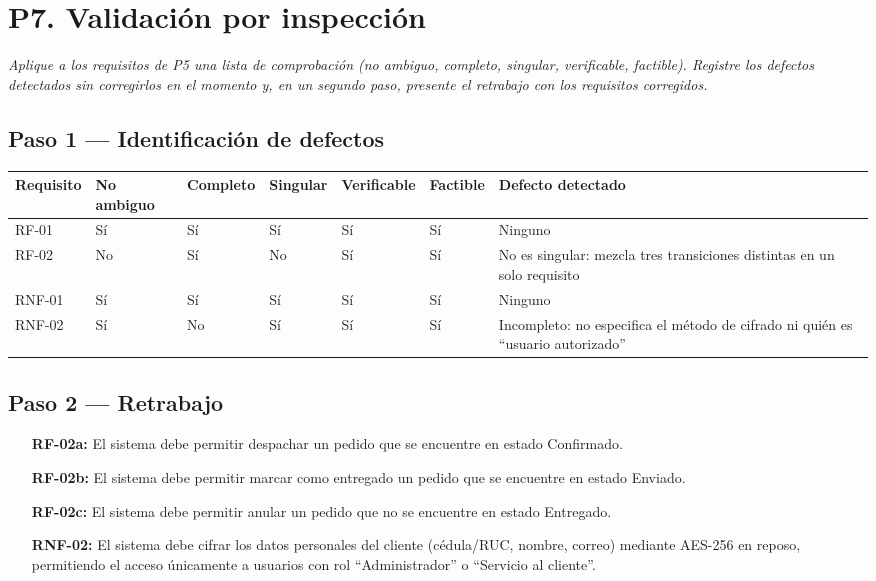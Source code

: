 \documentclass[11pt]{article}
\begin{document}
\section*{P7. Validación por inspección}

\textit{Aplique a los requisitos de P5 una lista de comprobación (no ambiguo, completo, singular, verificable, factible). Registre los defectos detectados sin corregirlos en el momento y, en un segundo paso, presente el retrabajo con los requisitos corregidos.}

\subsection*{Paso 1 --- Identificación de defectos}

\begin{center}
\small
\begin{tabular}{|p{1.4cm}|p{1.3cm}|p{1.3cm}|p{1.3cm}|p{1.5cm}|p{1.2cm}|p{4.5cm}|}
\hline
\textbf{Requisito} & \textbf{No ambiguo} & \textbf{Completo} & \textbf{Singular} & \textbf{Verificable} & \textbf{Factible} & \textbf{Defecto detectado} \\
\hline
RF-01 & Sí & Sí & Sí & Sí & Sí & Ninguno \\
\hline
RF-02 & No & Sí & No & Sí & Sí & No es singular: mezcla tres transiciones distintas en un solo requisito \\
\hline
RNF-01 & Sí & Sí & Sí & Sí & Sí & Ninguno \\
\hline
RNF-02 & Sí & No & Sí & Sí & Sí & Incompleto: no especifica el método de cifrado ni quién es ``usuario autorizado'' \\
\hline
\end{tabular}
\end{center}

\subsection*{Paso 2 --- Retrabajo}

\begin{itemize}[leftmargin=1.2cm]
\item[\textbf{RF-02a:}] El sistema debe permitir despachar un pedido que se encuentre en estado Confirmado.
\item[\textbf{RF-02b:}] El sistema debe permitir marcar como entregado un pedido que se encuentre en estado Enviado.
\item[\textbf{RF-02c:}] El sistema debe permitir anular un pedido que no se encuentre en estado Entregado.
\item[\textbf{RNF-02:}] El sistema debe cifrar los datos personales del cliente (cédula/RUC, nombre, correo) mediante AES-256 en reposo, permitiendo el acceso únicamente a usuarios con rol ``Administrador'' o ``Servicio al cliente''.
\end{itemize}
\end{document}
